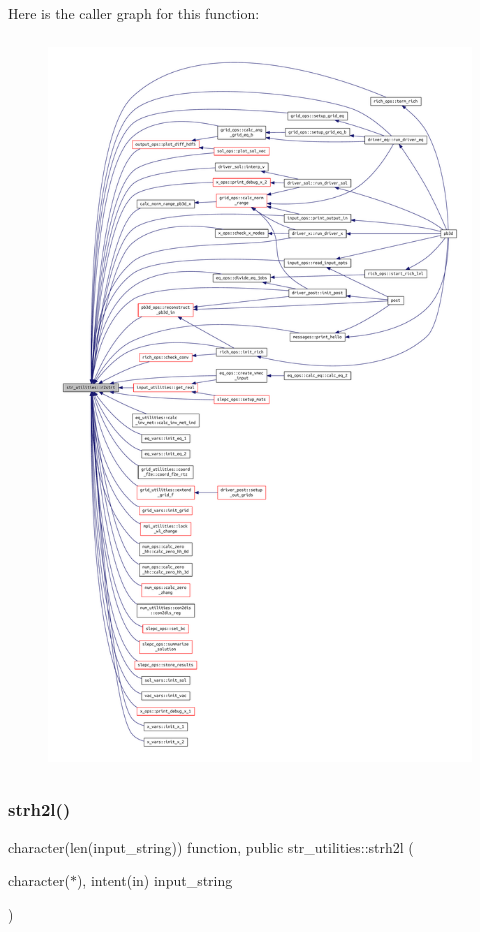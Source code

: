 Here is the caller graph for this function\+:\nopagebreak
\begin{figure}[H]
\begin{center}
\leavevmode
\includegraphics[height=550pt]{namespacestr__utilities_ac778d706b2e021672618939ab58fdd32_icgraph}
\end{center}
\end{figure}
\mbox{\label{namespacestr__utilities_a219964a283968cc6a968db0197d2187e}} 
\subsubsection{\texorpdfstring{strh2l()}{strh2l()}}
{\footnotesize\ttfamily character(len(input\+\_\+string)) function, public str\+\_\+utilities\+::strh2l (\begin{DoxyParamCaption}\item[{character($\ast$), intent(in)}]{input\+\_\+string }\end{DoxyParamCaption})}



